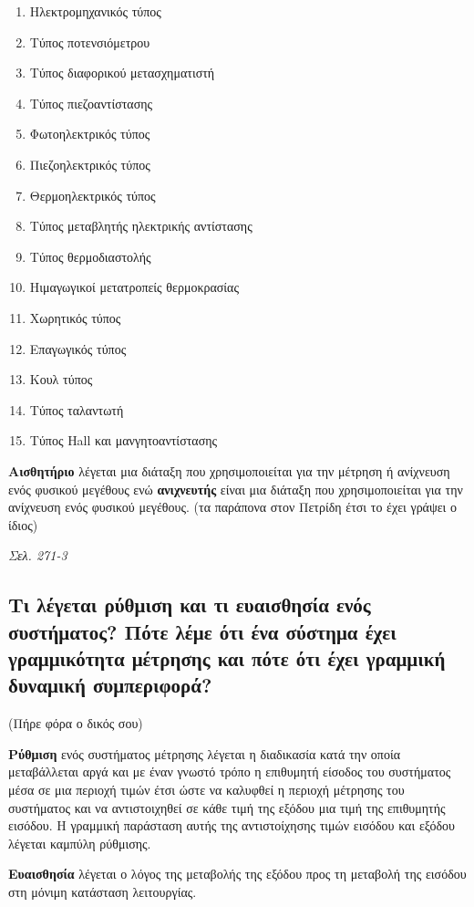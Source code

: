 \documentclass{article}
\begin{document}
\begin{enumerate}
    \item Ηλεκτρομηχανικός τύπος 
    \item Τύπος ποτενσιόμετρου
    \item Τύπος διαφορικού μετασχηματιστή
    \item Τύπος πιεζοαντίστασης
    \item Φωτοηλεκτρικός τύπος
    \item Πιεζοηλεκτρικός τύπος 
    \item Θερμοηλεκτρικός τύπος
    \item Τύπος μεταβλητής ηλεκτρικής αντίστασης
    \item Τύπος θερμοδιαστολής
    \item Ηιμαγωγικοί μετατροπείς θερμοκρασίας
    \item Χωρητικός τύπος 
    \item Επαγωγικός τύπος
    \item Κουλ τύπος
    \item Τύπος ταλαντωτή
    \item Τύπος \foreignlanguage{english}{Hall} και μανγητοαντίστασης
\end{enumerate}

\textbf{Αισθητήριο} λέγεται μια διάταξη που χρησιμοποιείται για την μέτρηση ή ανίχνευση ενός φυσικού μεγέθους ενώ \textbf{ανιχνευτής} είναι μια διάταξη που 
χρησιμοποιείται για την ανίχνευση ενός φυσικού μεγέθους. (τα παράπονα στον Πετρίδη έτσι το έχει γράψει ο ίδιος)

\emph{Σελ. 271-3}
\subsection{Τι λέγεται ρύθμιση και τι ευαισθησία ενός συστήματος? Πότε λέμε ότι ένα σύστημα έχει γραμμικότητα μέτρησης και πότε ότι έχει γραμμική δυναμική συμπεριφορά?}
\scriptsize (Πήρε φόρα ο δικός σου)
\normalsize

\textbf{Ρύθμιση} ενός συστήματος μέτρησης λέγεται η διαδικασία κατά την οποία μεταβάλλεται αργά και με έναν γνωστό τρόπο η επιθυμητή είσοδος του συστήματος μέσα σε μια
περιοχή τιμών έτσι ώστε να καλυφθεί η περιοχή μέτρησης του συστήματος και να αντιστοιχηθεί σε κάθε τιμή της εξόδου μια τιμή της επιθυμητής εισόδου. Η γραμμική παράσταση
αυτής της αντιστοίχησης τιμών εισόδου και εξόδου λέγεται καμπύλη ρύθμισης.

\textbf{Ευαισθησία} λέγεται ο λόγος της μεταβολής της εξόδου προς τη μεταβολή της εισόδου στη μόνιμη κατάσταση λειτουργίας.
\end{document}
